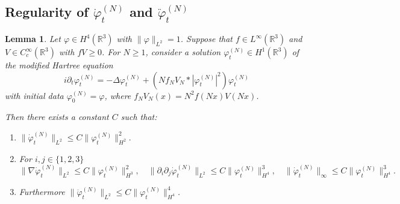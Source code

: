 \documentclass[11pt,a4paper,draft,DIV11]{scrartcl}	%
\newtheorem{lem}[thm]{Lemma}
\newcommand{\R}{\mathds{R}}
\newcommand{\norm}[1]{\lVert#1\rVert}	%
\newcommand{\ph}{\varphi_t^{(N)}}	%
\newcommand{\phdot}{\dot{\varphi}_t^{(N)}}	%
\newcommand{\phddot}{\ddot{\varphi}_t^{(N)}}	%
\newcommand{\bd}{\begin{displaymath}}			%
\newcommand{\ed}{\end{displaymath}}
\begin{document}
\subsection{Regularity of $\phdot$ and $\phddot$}
\label{sec:phdotreg}
\label{ss:phdotreg}
\begin{lem} \label{lm:phdotregularity}
Let $\varphi \in H^4(\R^3)$ with $\| \varphi \|_{L^2} = 1$. Suppose that
  $f \in L^\infty(\R^3)$ and $V \in C_c^\infty(\R^3)$ with $fV \ge 0$. For $N \ge
  1$, consider a solution $\varphi_t^{(N)} \in H^1(\R^3)$ of the modified
  Hartree equation
  \[
    i \partial_t \varphi_t^{(N)} = - \Delta \varphi_t^{(N)} + (N f_N V_N *
    |\varphi_t^{(N)}|^2) \varphi_t^{(N)}
  \]
  with initial data $\varphi^{(N)}_0 = \varphi$, where $f_N V_N(x) = N^2
  f(Nx)V(Nx)$.

Then there exists a constant $C$ such that:
\begin{enumerate}
 \item $\norm{\phdot}_{L^2} \leq C \norm{\ph}_{H^2}^2.$ %
\item For $i, j \in \{1,2,3\}$
\bd
\norm{\nabla \phdot}_{L^2} \leq C \norm{\ph}_{H^3}^2, \quad
\norm{\partial_i \partial_j \phdot}_{L^2} \leq C \norm{\ph}_{H^4}^3, \quad \norm{\phdot}_\infty \leq C \norm{\ph}_{H^4}^3.
\ed
\item Furthermore $\norm{\phddot}_{L^2} \leq C \norm{\ph}_{H^4}^4$.
\end{enumerate}
\end{lem}
\end{document}
